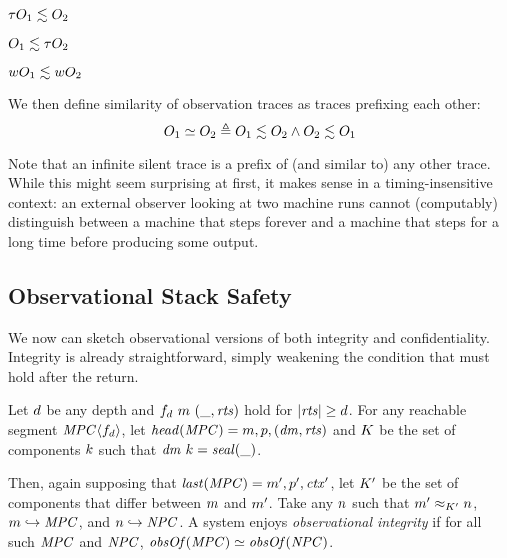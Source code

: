 \documentclass[acmsmall,review,anonymous]{acmart}\settopmatter{printfolios=true,printccs=false,printacmref=false}
\begin{document}
\begin{minipage}{.3\textwidth}
           {\(\tau O_1 \lesssim O_2\)}
\end{minipage}
\begin{minipage}{.3\textwidth}
           {\(O_1 \lesssim \tau O_2\)}
\end{minipage}
\begin{minipage}{.3\textwidth}
           {\(wO_1 \lesssim wO_2\)}
\end{minipage}

\smallskip
We then define similarity of observation traces as traces prefixing each other:
\[O_1 \simeq O_2 \triangleq O_1 \lesssim O_2 \land O_2 \lesssim O_1\]
%

Note that an infinite silent trace is a
prefix of (and similar to) any other trace. While this might seem
surprising at first, it makes sense in a timing-insensitive context:
an external observer looking at two machine runs cannot (computably)
distinguish between a machine that steps forever and a machine that
steps for a long time before producing some output.

\subsection{Observational Stack Safety}

We now can sketch observational versions of both integrity and confidentiality.
Integrity is already straightforward, simply weakening the condition that must hold
after the return.

 Let \(d\) be any depth and \(f_d ~ m ~ (\_, \mathit{rts})\) hold for
\(|\mathit{rts}| \geq d\). For any reachable segment \(\mathit{MPC} \langle f_d \rangle\),
let \(\mathit{head}(\mathit{MPC}) = m,p,(\mathit{dm},\mathit{rts})\) and
\(K\) be the set of components \(k\) such that \(\mathit{dm} ~ k = \mathit{seal(\_)}\).

Then, again supposing that \(\mathit{last}(\mathit{MPC}) = m',p',\mathit{ctx}'\),
let \(K'\) be the set of components that differ
between \(m\) and \(m'\). Take any \(n\) such that
\(m' \approx_{K'} n\), \(m \hookrightarrow \mathit{MPC}\), and
\(n \hookrightarrow \mathit{NPC}\). A system enjoys
{\em observational integrity} if for all such \(\mathit{MPC}\) and \(\mathit{NPC}\),
\(\mathit{obsOf}(\mathit{MPC}) \simeq \mathit{obsOf}(\mathit{NPC})\).
\end{document}
